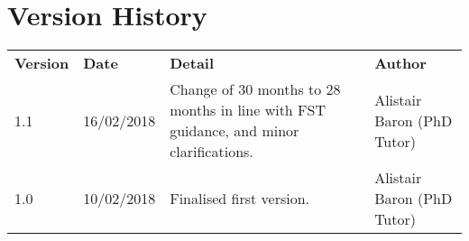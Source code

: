 \documentclass[12pt,a4paper]{article}
\begin{document}
\section{Version History}
\begin{tabularx}{\textwidth}{llXX}
	\textbf{Version} & \textbf{Date} & \textbf{Detail} & \textbf{Author} \\ 
	1.1	& 16/02/2018 & Change of 30 months to 28 months in line with FST guidance, and minor clarifications. & Alistair Baron (PhD Tutor) \\
	1.0 & 10/02/2018 & Finalised first version. & Alistair Baron (PhD Tutor) \\ 
\end{tabularx} 
\end{document}
